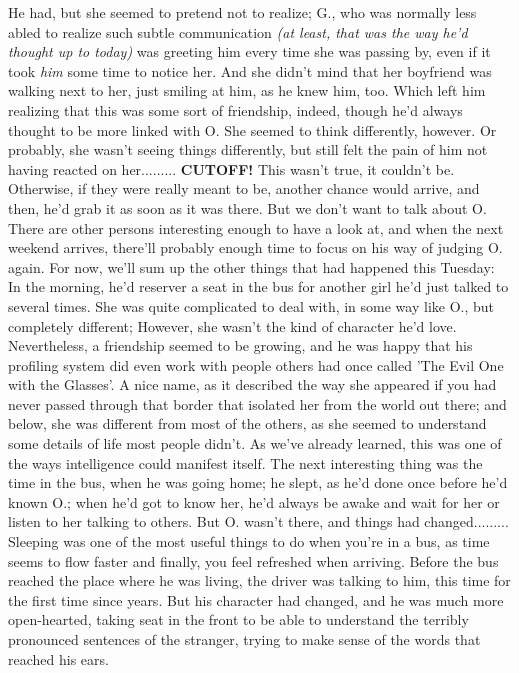 He had, but she seemed to pretend not to realize; G., who was normally less abled to realize such subtle communication \emph{(at least, that was the way he'd thought up to today)} was greeting him every time she was passing by, even if it took \emph{him} some time to notice her. And she didn't mind that her boyfriend was walking next to her, just smiling at him, as he knew him, too. 
Which left him realizing that this was some sort of friendship, indeed, though he'd always thought to be more linked with O. 
She seemed to think differently, however. 
Or probably, she wasn't seeing things differently, but still felt the pain of him not having reacted on her.........
\textbf{CUTOFF!}
This wasn't true, it couldn't be. Otherwise, if they were really meant to be, another chance would arrive, and then, he'd grab it as soon as it was there. 
But we don't want to talk about O. 
There are other persons interesting enough to have a look at, and when the next weekend arrives, there'll probably enough time to focus on his way of judging O. again. 
For now, we'll sum up the other things that had happened this Tuesday: In the morning, he'd reserver a seat in the bus for another girl he'd just talked to several times. She was quite complicated to deal with, in some way like O., but completely different; However, she wasn't the kind of character he'd love. 
Nevertheless, a friendship seemed to be growing, and he was happy that his profiling system did even work with people others had once called 'The Evil One with the Glasses'. 
A nice name, as it described the way she appeared if you had never passed through that border that isolated her from the world out there; and below, she was different from most of the others, as she seemed to understand some details of life most people didn't. As we've already learned, this was one of the ways intelligence could manifest itself. 
The next interesting thing was the time in the bus, when he was going home; he slept, as he'd done once before he'd known O.; when he'd got to know her, he'd always be awake and wait for her or listen to her talking to others. But O. wasn't there, and things had changed.........
Sleeping was one of the most useful things to do when you're in a bus, as time seems to flow faster and finally, you feel refreshed when arriving. 
Before the bus reached the place where he was living, the driver was talking to him, this time for the first time since years. 
But his character had changed, and he was much more open-hearted, taking seat in the front to be able to understand the terribly pronounced sentences of the stranger, trying to make sense of the words that reached his ears. 
